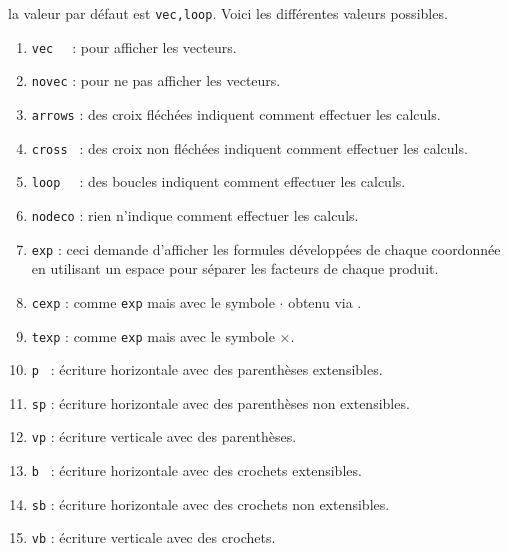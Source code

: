 \documentclass[12pt,a4paper]{article}
\begin{document}
\IDoption{} la valeur par défaut est \verb+vec,loop+. 
            Voici les différentes valeurs possibles.
\begin{enumerate}
	\item \verb+vec  + : pour afficher les vecteurs.

	\item \verb+novec+ : pour ne pas afficher les vecteurs.

	\medskip
	
	\item \verb+arrows+ : des croix fléchées indiquent comment effectuer les calculs.

	\item \verb+cross + : des croix non fléchées indiquent comment effectuer les calculs.

	\item \verb+loop  + : des boucles indiquent comment effectuer les calculs.

	\item \verb+nodeco+ : rien n'indique comment effectuer les calculs.

    \medskip

    \item \verb+exp+ : ceci demande d'afficher les formules développées de chaque coordonnée en utilisant un espace pour séparer les facteurs de chaque produit.

    \item \verb+cexp+ : comme \verb+exp+ mais avec le symbole $\cdot$ obtenu via .

    \item \verb+texp+ : comme \verb+exp+ mais avec le symbole $\times$.

	\medskip
	
	\item \verb+p + : écriture horizontale avec des parenthèses extensibles.

	\item \verb+sp+ : écriture horizontale avec des parenthèses non extensibles.

	\item \verb+vp+ : écriture verticale avec des parenthèses.

	\medskip
	
	\item \verb+b + : écriture horizontale avec des crochets extensibles.

	\item \verb+sb+ : écriture horizontale avec des crochets non extensibles.

	\item \verb+vb+ : écriture verticale avec des crochets.
\end{enumerate}
\end{document}
